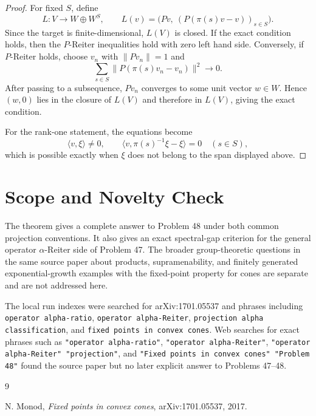 \documentclass[11pt]{article}
\begin{document}
\begin{proof}
For fixed $S$, define
\[
  L:V\to W\oplus W^S,\qquad
  L(v)=\big(Pv,\ (P(\pi(s)v-v))_{s\in S}\big).
\]
Since the target is finite-dimensional, $L(V)$ is closed.  If the exact
condition holds, then the $P$-Reiter inequalities hold with zero left hand
side.  Conversely, if $P$-Reiter holds, choose $v_n$ with $\|Pv_n\|=1$ and
\[
  \sum_{s\in S}\|P(\pi(s)v_n-v_n)\|^2\to0.
\]
After passing to a subsequence, $Pv_n$ converges to some unit vector
$w\in W$.  Hence $(w,0)$ lies in the closure of $L(V)$ and therefore in
$L(V)$, giving the exact condition.

For the rank-one statement, the equations become
\[
  \langle v,\xi\rangle\neq0,\qquad
  \langle v,\pi(s)^{-1}\xi-\xi\rangle=0\quad(s\in S),
\]
which is possible exactly when $\xi$ does not belong to the span displayed
above.
\end{proof}

\section*{Scope and Novelty Check}

The theorem gives a complete answer to Problem 48 under both common projection
conventions.  It also gives an exact spectral-gap criterion for the general
operator $\alpha$-Reiter side of Problem 47.  The broader group-theoretic
questions in the same source paper about products, supramenability, and
finitely generated exponential-growth examples with the fixed-point property
for cones are separate and are not addressed here.

The local run indexes were searched for arXiv:1701.05537 and phrases including
\texttt{operator alpha-ratio}, \texttt{operator alpha-Reiter},
\texttt{projection alpha classification}, and \texttt{fixed points in convex
cones}.  Web searches for exact phrases such as
\texttt{"operator alpha-ratio"}, \texttt{"operator alpha-Reiter"},
\texttt{"operator alpha-Reiter" "projection"}, and
\texttt{"Fixed points in convex cones" "Problem 48"} found the source paper
but no later explicit answer to Problems 47--48.

\begin{thebibliography}{9}

N. Monod,
\emph{Fixed points in convex cones},
arXiv:1701.05537, 2017.

\end{thebibliography}
\end{document}
